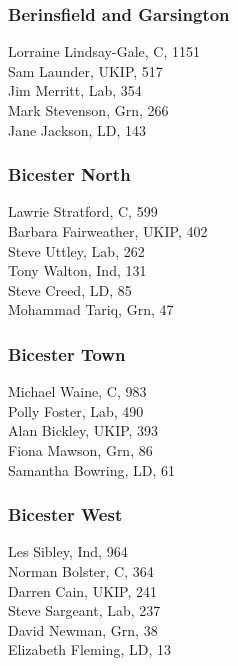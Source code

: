 \documentclass[a4paper,openany,10pt]{book}
\begin{document}
\subsubsection*{Berinsfield and Garsington}



{Lorraine Lindsay-Gale}, C, 1151\\
Sam Launder, UKIP, 517\\
Jim Merritt, Lab, 354\\
Mark Stevenson, Grn, 266\\
Jane Jackson, LD, 143\\


\subsubsection*{Bicester North}



Lawrie Stratford, C, 599\\
Barbara Fairweather, UKIP, 402\\
Steve Uttley, Lab, 262\\
Tony Walton, Ind, 131\\
Steve Creed, LD, 85\\
Mohammad Tariq, Grn, 47\\


\subsubsection*{Bicester Town}



Michael Waine, C, 983\\
Polly Foster, Lab, 490\\
Alan Bickley, UKIP, 393\\
Fiona Mawson, Grn, 86\\
Samantha Bowring, LD, 61\\


\subsubsection*{Bicester West}



Les Sibley, Ind, 964\\
Norman Bolster, C, 364\\
Darren Cain, UKIP, 241\\
Steve Sargeant, Lab, 237\\
David Newman, Grn, 38\\
Elizabeth Fleming, LD, 13\\
\end{document}

